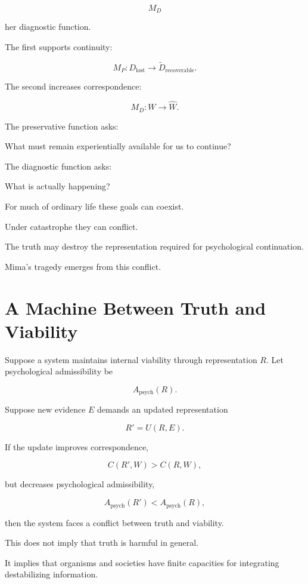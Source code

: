 \documentclass[11pt,oneside]{book}
\theoremstyle{definition}
\theoremstyle{remark}
\begin{document}
\[
M_D
\]

her diagnostic function.

The first supports continuity:

\[
M_P:
D_{\mathrm{lost}}
\rightarrow
\widetilde D_{\mathrm{recoverable}}.
\]

The second increases correspondence:

\[
M_D:
W
\rightarrow
\widehat W.
\]

The preservative function asks:

\begin{center}
What must remain experientially available for us to continue?
\end{center}

The diagnostic function asks:

\begin{center}
What is actually happening?
\end{center}

For much of ordinary life these goals can coexist.

Under catastrophe they can conflict.

The truth may destroy the representation required for psychological continuation.

Mima's tragedy emerges from this conflict.

\section{A Machine Between Truth and Viability}

Suppose a system maintains internal viability through representation \(R\). Let psychological admissibility be

\[
A_{\mathrm{psych}}(R).
\]

Suppose new evidence \(E\) demands an updated representation

\[
R'=U(R,E).
\]

If the update improves correspondence,

\[
C(R',W)>C(R,W),
\]

but decreases psychological admissibility,

\[
A_{\mathrm{psych}}(R')
<
A_{\mathrm{psych}}(R),
\]

then the system faces a conflict between truth and viability.

This does not imply that truth is harmful in general.

It implies that organisms and societies have finite capacities for integrating destabilizing information.
\end{document}
